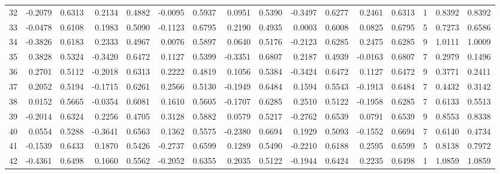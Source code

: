 \begin{tabular}{lrrrrrrrrrrrrrrr}
32  &     -0.2079 &  0.6313 &  0.2134 &  0.4882 & -0.0095 &  0.5937 &  0.0951 &  0.5390 & -0.3497 &  0.6277 &   0.2461 &     0.6313 &      1 &                    0.8392 &                     0.8392 \\
33  &     -0.0478 &  0.6108 &  0.1983 &  0.5090 & -0.1123 &  0.6795 &  0.2190 &  0.4935 &  0.0003 &  0.6008 &   0.0825 &     0.6795 &      5 &                    0.7273 &                     0.6586 \\
34  &     -0.3826 &  0.6183 &  0.2333 &  0.4967 &  0.0076 &  0.5897 &  0.0640 &  0.5176 & -0.2123 &  0.6285 &   0.2475 &     0.6285 &      9 &                    1.0111 &                     1.0009 \\
35  &      0.3828 &  0.5324 & -0.3420 &  0.6472 &  0.1127 &  0.5399 & -0.3351 &  0.6807 &  0.2187 &  0.4939 &  -0.0163 &     0.6807 &      7 &                    0.2979 &                     0.1496 \\
36  &      0.2701 &  0.5112 & -0.2018 &  0.6313 &  0.2222 &  0.4819 &  0.1056 &  0.5384 & -0.3424 &  0.6472 &   0.1127 &     0.6472 &      9 &                    0.3771 &                     0.2411 \\
37  &      0.2052 &  0.5194 & -0.1715 &  0.6261 &  0.2566 &  0.5130 & -0.1949 &  0.6484 &  0.1594 &  0.5543 &  -0.1913 &     0.6484 &      7 &                    0.4432 &                     0.3142 \\
38  &      0.0152 &  0.5665 & -0.0354 &  0.6081 &  0.1610 &  0.5605 & -0.1707 &  0.6285 &  0.2510 &  0.5122 &  -0.1958 &     0.6285 &      7 &                    0.6133 &                     0.5513 \\
39  &     -0.2014 &  0.6324 &  0.2256 &  0.4705 &  0.3128 &  0.5882 &  0.0579 &  0.5217 & -0.2762 &  0.6539 &   0.0791 &     0.6539 &      9 &                    0.8553 &                     0.8338 \\
40  &      0.0554 &  0.5288 & -0.3641 &  0.6563 &  0.1362 &  0.5575 & -0.2380 &  0.6694 &  0.1929 &  0.5093 &  -0.1552 &     0.6694 &      7 &                    0.6140 &                     0.4734 \\
41  &     -0.1539 &  0.6433 &  0.1870 &  0.5426 & -0.2737 &  0.6599 &  0.1289 &  0.5490 & -0.2210 &  0.6188 &   0.2595 &     0.6599 &      5 &                    0.8138 &                     0.7972 \\
42  &     -0.4361 &  0.6498 &  0.1660 &  0.5562 & -0.2052 &  0.6355 &  0.2035 &  0.5122 & -0.1944 &  0.6424 &   0.2235 &     0.6498 &      1 &                    1.0859 &                     1.0859 \\

\end{tabular}
